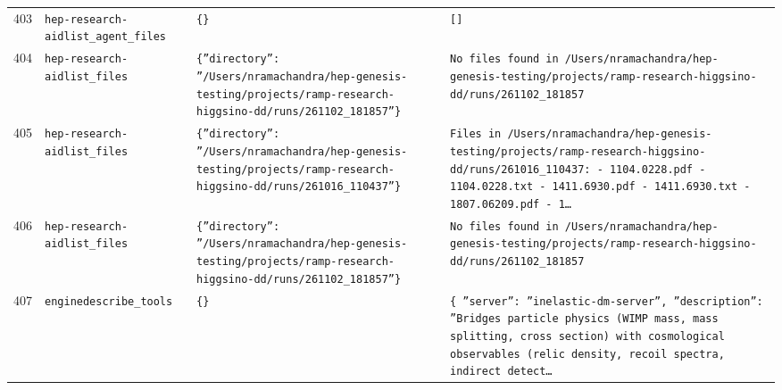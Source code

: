 \documentclass[11pt,a4paper]{article}
\begin{document}
\begin{longtable}{@{}p{}p{}p{}p{}@{}}
403 & \texttt{hep-research-aid}\newline\texttt{list\_\allowbreak{}agent\_\allowbreak{}files} & \texttt{\{\}\allowbreak{}} & \texttt{[]\allowbreak{}} \\
404 & \texttt{hep-research-aid}\newline\texttt{list\_\allowbreak{}files} & \texttt{\{''directory'':\allowbreak{} ''/\allowbreak{}Users/\allowbreak{}nramachandra/\allowbreak{}hep-genesis-testing/\allowbreak{}projects/\allowbreak{}ramp-research-higgsino-dd/\allowbreak{}runs/\allowbreak{}261102\_\allowbreak{}181857''\}\allowbreak{}} & \texttt{No files found in /\allowbreak{}Users/\allowbreak{}nramachandra/\allowbreak{}hep-genesis-testing/\allowbreak{}projects/\allowbreak{}ramp-research-higgsino-dd/\allowbreak{}runs/\allowbreak{}261102\_\allowbreak{}181857} \\
405 & \texttt{hep-research-aid}\newline\texttt{list\_\allowbreak{}files} & \texttt{\{''directory'':\allowbreak{} ''/\allowbreak{}Users/\allowbreak{}nramachandra/\allowbreak{}hep-genesis-testing/\allowbreak{}projects/\allowbreak{}ramp-research-higgsino-dd/\allowbreak{}runs/\allowbreak{}261016\_\allowbreak{}110437''\}\allowbreak{}} & \texttt{Files in /\allowbreak{}Users/\allowbreak{}nramachandra/\allowbreak{}hep-genesis-testing/\allowbreak{}projects/\allowbreak{}ramp-research-higgsino-dd/\allowbreak{}runs/\allowbreak{}261016\_\allowbreak{}110437:\allowbreak{}   - 1104.0228.pdf   - 1104.0228.txt   - 1411.6930.pdf   - 1411.6930.txt   - 1807.06209.pdf   - 1\ldots{}\allowbreak{}} \\
406 & \texttt{hep-research-aid}\newline\texttt{list\_\allowbreak{}files} & \texttt{\{''directory'':\allowbreak{} ''/\allowbreak{}Users/\allowbreak{}nramachandra/\allowbreak{}hep-genesis-testing/\allowbreak{}projects/\allowbreak{}ramp-research-higgsino-dd/\allowbreak{}runs/\allowbreak{}261102\_\allowbreak{}181857''\}\allowbreak{}} & \texttt{No files found in /\allowbreak{}Users/\allowbreak{}nramachandra/\allowbreak{}hep-genesis-testing/\allowbreak{}projects/\allowbreak{}ramp-research-higgsino-dd/\allowbreak{}runs/\allowbreak{}261102\_\allowbreak{}181857} \\
407 & \texttt{engine}\newline\texttt{describe\_\allowbreak{}tools} & \texttt{\{\}\allowbreak{}} & \texttt{\{   ''server'':\allowbreak{} ''inelastic-dm-server'',\allowbreak{}   ''description'':\allowbreak{} ''Bridges particle physics (WIMP mass,\allowbreak{} mass splitting,\allowbreak{} cross section)\allowbreak{} with cosmological observables (relic density,\allowbreak{} recoil spectra,\allowbreak{} indirect detect\ldots{}\allowbreak{}} \\

\end{longtable}
\end{document}
